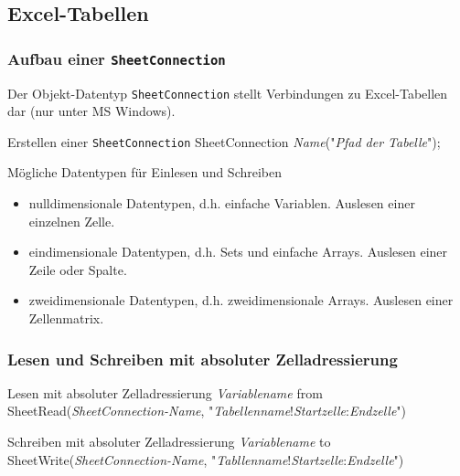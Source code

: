\subsection{Excel-Tabellen}
\begin{frame}
 \frametitle{Aufbau einer \texttt{SheetConnection}}
 Der Objekt-Datentyp \texttt{SheetConnection} stellt Verbindungen zu Excel-Tabellen dar (nur unter MS Windows).
 \begin{block}{Erstellen einer \texttt{SheetConnection}}
  \ttfamily
  SheetConnection \textsf{\slshape Name}("\textsf{\slshape Pfad der Tabelle}");
 \end{block}
 \begin{block}{Mögliche Datentypen für Einlesen und Schreiben}
  \begin{itemize}
   \item nulldimensionale Datentypen, d.h. einfache Variablen. Auslesen einer einzelnen Zelle.
   \item eindimensionale Datentypen, d.h. Sets und einfache Arrays. Auslesen einer Zeile oder Spalte.
   \item zweidimensionale Datentypen, d.h. zweidimensionale Arrays. Auslesen einer Zellenmatrix.
  \end{itemize}
 \end{block}
\end{frame}

\begin{frame}
 \frametitle{Lesen und Schreiben mit absoluter Zelladressierung}
 \begin{block}{Lesen mit absoluter Zelladressierung}
  \ttfamily
  \textsf{\slshape Variablename} from SheetRead(\textsf{\slshape SheetConnection-Name}, "\textsf{\slshape Tabellenname}!\textsf{\slshape Startzelle}:\textsf{\slshape Endzelle}")
 \end{block}
 \begin{block}{Schreiben mit absoluter Zelladressierung}
  \ttfamily
  \textsf{\slshape Variablename} to SheetWrite(\textsf{\slshape SheetConnection-Name}, "\textsf{\slshape Tabllenname}!\textsf{\slshape Startzelle}:\textsf{\slshape Endzelle}")
 \end{block}
\end{frame}

